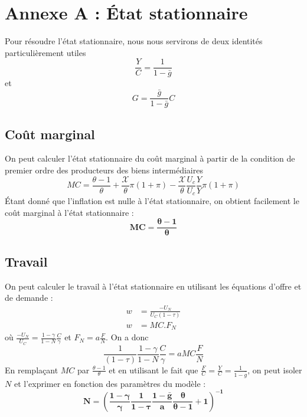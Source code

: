 \documentclass[12pt,letterpaper]{article}
\newcommand{\gbar}{\bar{g}}
\newcommand{\XX}{\mathcal{X}}
\begin{document}
\newpage
\appendix
\section*{Annexe A : État stationnaire}

Pour résoudre l’état stationnaire, nous nous servirons de deux identités particulièrement utiles
\begin{equation}
\frac{Y}{C} = \frac{1}{1-\gbar} \tag{1}
\end{equation}
et
\begin{equation}
G = \frac{\gbar}{1-\gbar}C \tag{2}
\end{equation}

\subsection*{Coût marginal}

On peut calculer l’état stationnaire du coût marginal à partir de la condition de premier ordre des producteurs des biens intermédiaires
\begin{equation*}
MC = \frac{\theta-1}{\theta} + \frac{\XX}{\theta}\pi(1+\pi) - \frac{\XX}{\theta}\frac{U_c}{U_c}\frac{Y}{Y}\pi(1+\pi)
\end{equation*}
Étant donné que l’inflation est nulle à l’état stationnaire, on obtient facilement le coût marginal à l’état stationnaire :
\begin{equation*}
\boldsymbol{MC = \frac{\theta-1}{\theta}}
\end{equation*}

\subsection*{Travail}

On peut calculer le travail à l’état stationnaire en utilisant les équations d’offre et de demande :
\begin{align*}
w &= \frac{-U_N}{U_C(1-\tau)}\\
w &= MC.F_N
\end{align*}
où $\frac{-U_N}{U_C} = \frac{1-\gamma}{1-N}\frac{C}{\gamma}$ et $F_N = a\frac{F}{N}$. On a donc
\begin{equation*}
\frac{1}{(1-\tau)}\frac{1-\gamma}{1-N}\frac{C}{\gamma} = aMC\frac{F}{N}
\end{equation*}
En remplaçant $MC$ par $\frac{\theta-1}{\theta}$ et en utilisant le fait que $\frac{F}{C} = \frac{Y}{C} = \frac{1}{1-\gbar}$, on peut isoler $N$ et l’exprimer en fonction des paramètres du modèle :
\begin{equation*}
\boldsymbol{N = \left(\frac{1-\gamma}{\gamma}\frac{1}{1-\tau}\frac{1-\gbar}{a}\frac{\theta}{\theta-1} + 1\right)^{-1}}
\end{equation*}
\end{document}
